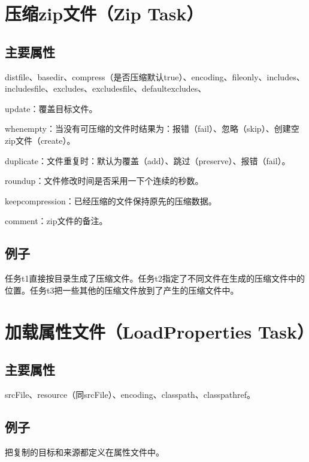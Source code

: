 \section{压缩zip文件（Zip Task）}

\subsection{主要属性}

distfile、basedir、compress（是否压缩默认true）、encoding、fileonly、includes、includesfile、excludes、excludesfile、defaultexcludes、

update：覆盖目标文件。

whenempty：当没有可压缩的文件时结果为：报错（fail）、忽略（skip）、创建空zip文件（create）。

duplicate：文件重复时：默认为覆盖（add）、跳过（preserve）、报错（fail）。

roundup：文件修改时间是否采用一下个连续的秒数。

keepcompression：已经压缩的文件保持原先的压缩数据。

comment：zip文件的备注。

\subsection{例子}

任务t1直接按目录生成了压缩文件。任务t2指定了不同文件在生成的压缩文件中的位置。任务t3把一些其他的压缩文件放到了产生的压缩文件中。








\section{加载属性文件（LoadProperties Task）}

\subsection{主要属性}

srcFile、resource（同srcFile）、encoding、classpath、classpathref。

\subsection{例子}

把复制的目标和来源都定义在属性文件中。

